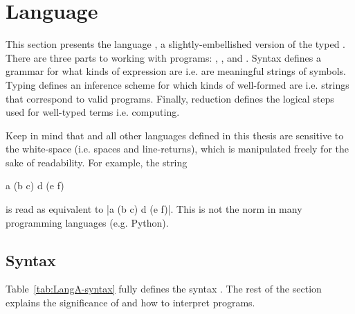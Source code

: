 \newpage
\section{Language \LangA}
\label{sec:LangA}

This section presents the language \LangA, a slightly-embellished version of the typed \lc.
There are three parts to working with \LangA programs: , , and .
Syntax defines a grammar for what kinds of expression are  i.e. are meaningful strings of symbols.
Typing defines an inference scheme for which kinds of well-formed are  i.e. strings that correspond to valid programs.
Finally, reduction defines the logical steps used for  well-typed terms i.e. computing.

Keep in mind that \LangA and all other languages defined in this thesis are  sensitive to the white-space (i.e. spaces and line-returns), which is manipulated freely for the sake of readability.
For example, the string
\begin{snippet}
a (b c)
  d
  (e
    f)
\end{snippet}
is read as equivalent to \code|a (b c) d (e f)|.
This is not the norm in many programming languages (e.g. Python).

\newpage

\subsection{Syntax}


Table~\ref{tab:LangA-syntax} fully defines the syntax \LangA.
The rest of the section explains the significance of and how to interpret \LangA programs.



